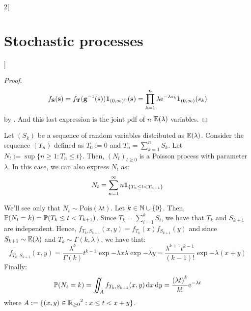 \documentclass[../../../main_math.tex]{subfiles}
\begin{document}
\begin{multicols}{2}[\section{Stochastic processes}]
\begin{proof}
    $$
      f_{\boldsymbol{\mathrm{S}}}(\boldsymbol{\mathrm{s}})=f_{\boldsymbol{\mathrm{T}}}(\boldsymbol{\mathrm{g}}^{-1}(\boldsymbol{\mathrm{s}}))\boldsymbol{\mathrm{1}}_{{(0,\infty)}^n}(\boldsymbol{\mathrm{s}})=\prod_{k= 1}^n \lambda \mathrm{e}^{-\lambda s_k}\boldsymbol{\mathrm{1}}_{(0,\infty)}(s_k)
    $$
    by . And this last expression is the joint pdf of $n$ \iid $\mathbb{E}(\lambda)$ variables.
  \end{proof}
  \begin{theorem}
    Let ${(S_k)}$ be a sequence of \iid random variables distributed as $\mathbb{E}(\lambda)$. Consider the sequence $(T_n)$ defined as $T_0:=0$ and $T_n=\sum_{k=1}^{n}S_k$. Let $N_t:=\sup\{n\geq 1:T_n\leq t\}$. Then, ${(N_t)}_{t\geq 0}$ is a Poisson process with parameter $\lambda$. In this case, we can also express $N_t$ as:
    $$
      N_t=\sum_{n=1}^\infty n \boldsymbol{\mathrm{1}}_{\{T_n\leq t<T_{n+1}\}}
    $$
  \end{theorem}
  \begin{sproof}
    We'll see only that $N_t\sim \text{Pois}(\lambda t)$. Let $k\in\mathbb{N}\cup \{0\}$. Then, $\mathbb{P}(N_t=k)=\mathbb{P}(T_k\leq t<T_{k+1})$. Since $T_k=\sum_{i=1}^k S_i$, we have that $T_{k}$ and $S_{k+1}$ are independent. Hence, $f_{T_k,S_{k+1}}(x,y)=f_{T_k}(x)f_{S_{k+1}}(y)$ and since $S_{k+1}\sim \mathbb{E}(\lambda)$ and $T_k\sim \Gamma(k,\lambda)$, we have that:
    $$
      f_{T_k,S_{k+1}}(x,y)=\frac{\lambda^k}{\Gamma(k)}t^{k-1}\exp{-\lambda x}\lambda \exp{-\lambda y}=\frac{\lambda^{k+1}t^{k-1}}{(k-1)!}\exp{-\lambda (x+y)}
    $$
    Finally:
    $$
      \mathbb{P}(N_t=k)=\iint_{A}f_{T_k,S_{k+1}}(x,y) \dd{x}\dd{y}=\frac{{(\lambda t)}^k}{k!}\mathrm{e}^{-\lambda t}
    $$
    where $A:=\{(x,y)\in{\ensuremath{\mathbb{R}}_{\geq 0}}^2: x\leq t< x+y\}$.
  \end{sproof}

\end{multicols}
\end{document}
